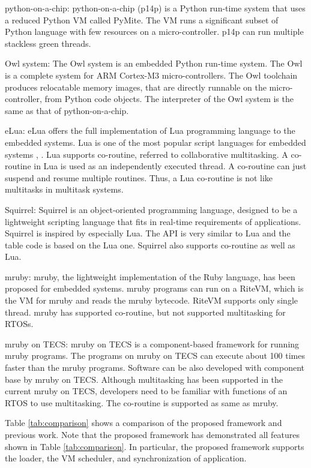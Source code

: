 \documentclass{sig-alternate-05-2015}
\begin{document}
{\mybf python-on-a-chip:} python-on-a-chip (p14p) is a Python run-time system that uses a reduced Python VM called PyMite.
The VM runs a significant subset of Python language with few resources on a micro-controller.
p14p can run multiple stackless green threads.

{\mybf Owl system:} The Owl system is an embedded Python run-time system.
The Owl is a complete system for ARM Cortex-M3 micro-controllers.
The Owl toolchain produces relocatable memory images, that are directly runnable on the micro-controller, from Python code objects.
The interpreter of the Owl system is the same as that of python-on-a-chip.

{\mybf eLua:} eLua offers the full implementation of Lua programming language to the embedded systems.
Lua is one of the most popular script languages for embedded systems \cite{url:Lua}, \cite{par:Lua}.
Lua supports co-routine, referred to collaborative multitasking.
A co-routine in Lua is used as an independently executed thread.
A co-routine can just suspend and resume multiple routines.
Thus, a Lua co-routine is not like multitasks in multitask systems.

{\mybf Squirrel:} Squirrel is an object-oriented programming language, designed to be a lightweight scripting language that fits in real-time requirements of applications.
Squirrel is inspired by especially Lua.
The API is very similar to Lua and the table code is based on the Lua one.
Squirrel also supports co-routine as well as Lua.

{\mybf mruby:} mruby, the lightweight implementation of the Ruby language, has been proposed for embedded systems.
mruby programs can run on a RiteVM, which is the VM for mruby and reads the mruby bytecode.
RiteVM supports only single thread.
mruby has supported co-routine, but not supported multitasking for RTOSs.

{\mybf mruby on TECS:} mruby on TECS is a component-based framework for running mruby programs.
The programs on mruby on TECS can execute about 100 times faster than the mruby programs.
Software can be also developed with component base by mruby on TECS.
Although multitasking has been supported in the current mruby on TECS, developers need to be familiar with functions of an RTOS to use multitasking.
The co-routine is supported as same as mruby.

Table \ref{tab:comparison} shows a comparison of the proposed framework and previous work.
Note that the proposed framework has demonstrated all features shown in Table \ref{tab:comparison}.
In particular, the proposed framework supports the loader, the VM scheduler, and synchronization of application.
 
\end{document}
